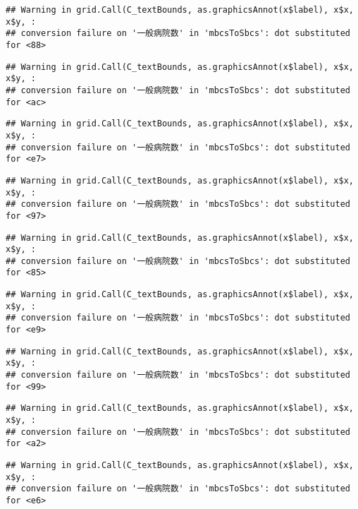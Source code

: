 \documentclass[
]{article}
\begin{document}
\begin{verbatim}
## Warning in grid.Call(C_textBounds, as.graphicsAnnot(x$label), x$x, x$y, :
## conversion failure on '一般病院数' in 'mbcsToSbcs': dot substituted for <88>
\end{verbatim}

\begin{verbatim}
## Warning in grid.Call(C_textBounds, as.graphicsAnnot(x$label), x$x, x$y, :
## conversion failure on '一般病院数' in 'mbcsToSbcs': dot substituted for <ac>
\end{verbatim}

\begin{verbatim}
## Warning in grid.Call(C_textBounds, as.graphicsAnnot(x$label), x$x, x$y, :
## conversion failure on '一般病院数' in 'mbcsToSbcs': dot substituted for <e7>
\end{verbatim}

\begin{verbatim}
## Warning in grid.Call(C_textBounds, as.graphicsAnnot(x$label), x$x, x$y, :
## conversion failure on '一般病院数' in 'mbcsToSbcs': dot substituted for <97>
\end{verbatim}

\begin{verbatim}
## Warning in grid.Call(C_textBounds, as.graphicsAnnot(x$label), x$x, x$y, :
## conversion failure on '一般病院数' in 'mbcsToSbcs': dot substituted for <85>
\end{verbatim}

\begin{verbatim}
## Warning in grid.Call(C_textBounds, as.graphicsAnnot(x$label), x$x, x$y, :
## conversion failure on '一般病院数' in 'mbcsToSbcs': dot substituted for <e9>
\end{verbatim}

\begin{verbatim}
## Warning in grid.Call(C_textBounds, as.graphicsAnnot(x$label), x$x, x$y, :
## conversion failure on '一般病院数' in 'mbcsToSbcs': dot substituted for <99>
\end{verbatim}

\begin{verbatim}
## Warning in grid.Call(C_textBounds, as.graphicsAnnot(x$label), x$x, x$y, :
## conversion failure on '一般病院数' in 'mbcsToSbcs': dot substituted for <a2>
\end{verbatim}

\begin{verbatim}
## Warning in grid.Call(C_textBounds, as.graphicsAnnot(x$label), x$x, x$y, :
## conversion failure on '一般病院数' in 'mbcsToSbcs': dot substituted for <e6>
\end{verbatim}
\end{document}
